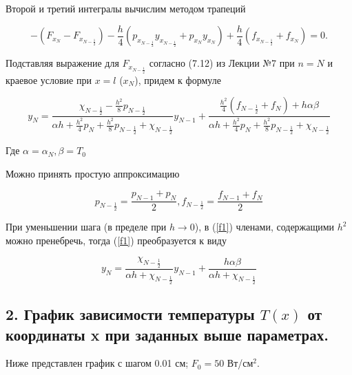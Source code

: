 \documentclass[a4paper,12pt]{article}
\begin{document}
	Второй и третий интегралы вычислим методом трапеций
	
	\[
	-(F_{x_N}-F_{x_{N-\frac{1}{2}}})-\frac{h}{4}(p_{x_{N-\frac{1}{2}}} y_{x_{N-\frac{1}{2}}} + p_{x_N} y_{x_N}) + \frac{h}{4} (f_{x_{N-\frac{1}{2}}} + f_{x_N}) = 0.
	\]
	
	Подставляя выражение для $F_{x_{N-\frac{1}{2}}}$ согласно (7.12) из Лекции №7 при $n = N$ и краевое условие при $x = l$ ($x_N$), придем к формуле
	
	\begin{equation}\label{f1}
		y_N = \frac{
			\chi_{N-\frac{1}{2}}-\frac{h^2}{8}p_{N-\frac{1}{2}}
		}{
		\alpha h + \frac{h^2}{4}p_N+\frac{h^2}{8}p_{N-\frac{1}{2}}+\chi_{N-\frac{1}{2}}
	} y_{N-1} + \frac{
	\frac{h^2}{4}(f_{N-\frac{1}{2}}+f_N)+h\alpha \beta
}{
	\alpha h + \frac{h^2}{4}p_N+\frac{h^2}{8}p_{N-\frac{1}{2}}+\chi_{N-\frac{1}{2}}
}
	\end{equation}
	
	Где $\alpha = \alpha_N, \beta = T_0$
	
	Можно принять простую аппроксимацию
	
	\[p_{N-\frac{1}{2}} = \frac{p_{N-1}+p_N}{2}, f_{N-\frac{1}{2}} = \frac{f_{N-1}+f_N}{2}\]
	
	При уменьшении шага (в пределе при $h\rightarrow0$), в (\ref{f1}) членами, содержащими $h^2$ можно пренебречь, тогда (\ref{f1}) преобразуется к виду
	
	\[
	y_N = \frac{\chi_{N - \frac{1}{2}}}{\alpha h + \chi_{N - \frac{1}{2}}} y_{N-1} + \frac{h \alpha \beta}{\alpha h + \chi_{N-\frac{1}{2}}}
	\]
	
	\newpage
	
	\subsection*{2. График зависимости температуры $T(x)$ от координаты x при заданных выше параметрах.}
	
	Ниже представлен график с шагом 0.01 см; $F_0 = 50$ Вт/см$^2$.
	
\end{document}
